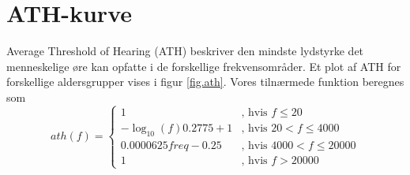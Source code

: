 \section{ATH-kurve}
Average Threshold of Hearing (ATH) beskriver den mindste lydstyrke det
menneskelige øre kan opfatte i de forskellige frekvensområder. Et plot
af ATH for forskellige aldersgrupper vises i figur
\ref{fig.ath}. Vores tilnærmede funktion beregnes som
\begin{equation}
ath(f) = \left\{
\begin{array}{ll}
1                         & \textrm{, hvis } f \leq 20\\
-\log_{10}(f) 0.2775 + 1& \textrm{, hvis } 20 < f \leq 4000\\
0.0000625 freq - 0.25   & \textrm{, hvis } 4000 < f \leq 20000\\
1                         & \textrm{, hvis } f > 20000
\end{array} \right.
\end{equation}

